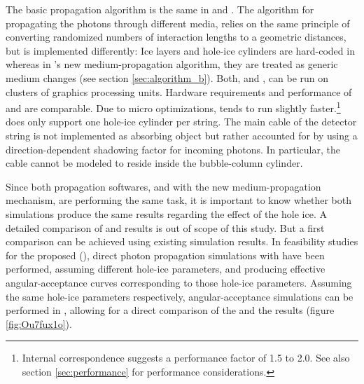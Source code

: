 The basic propagation algorithm is the same in \ppc and \clsim. The algorithm for propagating the photons through different media, relies on the same principle of converting randomized numbers of interaction lengths to a geometric distances, but is implemented differently: Ice layers and hole-ice cylinders are hard-coded in \ppc whereas in \clsim's new medium-propagation algorithm, they are treated as generic medium changes (see section \ref{sec:algorithm_b}). Both, \ppc and \clsim, can be run on clusters of graphics processing units. \cite{ppcpaper, ppcsource, ppcforhumans, clsimsource}
Hardware requirements and performance of \ppc and \clsim are comparable. Due to micro optimizations, \ppc tends to run slightly faster.\footnote{Internal correspondence suggests a performance factor of 1.5 to 2.0. See also section \ref{sec:performance} for performance considerations.}
\ppc does only support one hole-ice cylinder per string. The main cable of the detector string is not implemented as absorbing object but rather accounted for by using a direction-dependent shadowing factor for incoming photons. \cite{ppcsource, ppcforhumans}
In particular, the cable cannot be modeled to reside inside the bubble-column cylinder. \cite{martinspicehddard}

Since both propagation softwares, \ppc and \clsim with the new medium-propagation mechanism, are performing the same task, it is important to know whether both simulations produce the same results regarding the effect of the hole ice. A detailed comparison of \ppc and \clsim results is out of scope of this study. But a first comparison can be achieved using existing \ppc simulation results. \followup
In feasibility studies for the proposed  (), direct photon propagation simulations with \ppc have been performed, assuming different hole-ice parameters, and producing effective angular-acceptance curves corresponding to those hole-ice parameters. \cite{pocam, icrc17pocam}
Assuming the same hole-ice parameters respectively, angular-acceptance simulations can be performed in \clsim, allowing for a direct comparison of the \ppc and the \clsim results (figure \ref{fig:Ou7fux1o}).


